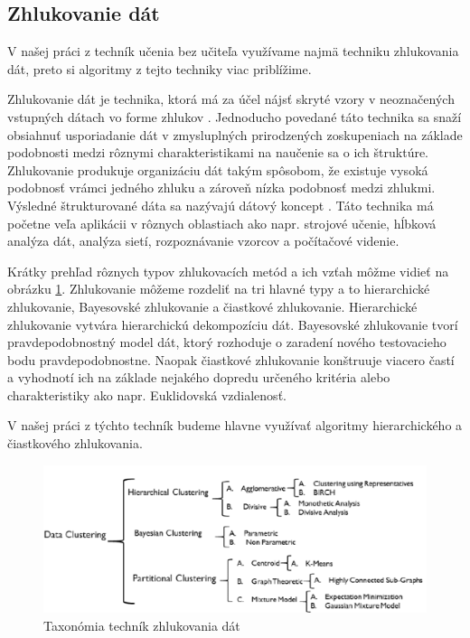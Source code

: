 \subsection{Zhlukovanie dát}
V našej práci z techník učenia bez učiteľa využívame najmä techniku zhlukovania dát, preto si algoritmy z tejto techniky viac priblížime.\par
Zhlukovanie dát je technika, ktorá má za účel nájsť skryté vzory v neoznačených vstupných dátach vo forme zhlukov \cite{zhluk_basic}. Jednoducho povedané táto technika sa snaží obsiahnuť usporiadanie dát v zmysluplných prirodzených zoskupeniach na základe podobnosti medzi rôznymi charakteristikami na naučenie sa o ich štruktúre. Zhlukovanie produkuje organizáciu dát takým spôsobom, že existuje vysoká podobnosť vrámci jedného zhluku a zároveň nízka podobnosť medzi zhlukmi. Výsledné štrukturované dáta sa nazývajú dátový koncept \cite{data_concept}. Táto technika má početne veľa aplikácii v rôznych oblastiach ako napr. strojové učenie, hĺbková analýza dát, analýza sietí, rozpoznávanie vzorcov a počítačové videnie.\par
Krátky prehľad rôznych typov zhlukovacích metód a ich vzťah môžme vidieť na obrázku \ref{img:zhluk}. Zhlukovanie môžeme rozdeliť na tri hlavné typy a to hierarchické zhlukovanie, Bayesovské zhlukovanie a čiastkové zhlukovanie. Hierarchické zhlukovanie vytvára hierarchickú dekompozíciu dát. Bayesovské zhlukovanie tvorí pravdepodobnostný model dát, ktorý rozhoduje o zaradení nového testovacieho bodu pravdepodobnostne. Naopak čiastkové zhlukovanie konštruuje viacero častí a vyhodnotí ich na základe nejakého dopredu určeného kritéria alebo charakteristiky ako napr. Euklidovská vzdialenosť.\par
V našej práci z týchto techník budeme hlavne využívať algoritmy hierarchického a čiastkového zhlukovania.
\begin{figure}[H]
	\begin{center}
		\includegraphics[scale=0.55]{img/tax_zhluk.png}
		\caption{Taxonómia techník zhlukovania dát \cite{unsupervised}}
		\label{img:zhluk}
	\end{center}
\end{figure}
